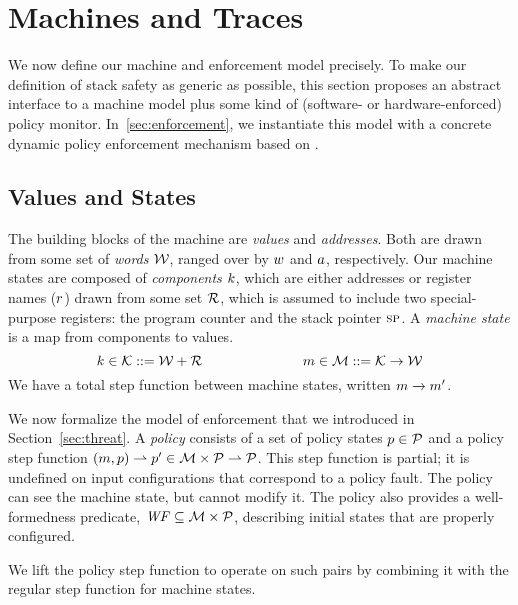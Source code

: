 \documentclass[acmsmall,review,anonymous]{acmart}\settopmatter{printfolios=true,printccs=false,printacmref=false}
\begin{document}
\section{Machines and Traces}
\label{sec:prelim}

We now define our machine and enforcement model precisely. To make our definition of stack safety
as generic as possible, this section proposes an abstract interface to a
machine model plus some kind of (software- or hardware-enforced) policy monitor.
In~\cref{sec:enforcement}, we instantiate this model with a concrete dynamic
policy enforcement mechanism based on \citet{DBLP:conf/sp/RoesslerD18}.

\subsection{Values and States}

The building blocks of the machine are {\em values} and {\em addresses}.
Both are drawn from some set of {\em words} \({\mathcal W}\), ranged over by \(w\) and
\(a\), respectively.
%
Our machine states are composed of {\em components} \(k\),
which are either addresses or register names (\(r\)) drawn from some set
\({\mathcal R}\), which is assumed to include two special-purpose registers: the
program counter {\PCname} and the stack pointer \(\textsc{sp}\).
A {\em machine state} is a map from components to values.
%
    \[k \in {\mathcal K} ::= {\mathcal W} + {\mathcal R}  \hspace{1in}
    m \in {\mathcal M} ::= {\mathcal K} \rightarrow {\mathcal W}\]
%
We have a total step function between machine states, written \(m \xrightarrow{} m'\).

We now formalize the model of enforcement that we introduced in Section~\ref{sec:threat}.
A {\em policy} consists of a set of policy
states \(p \in \mathcal{P}\) and a policy step function \((m, p) \rightharpoonup p' \in
{\mathcal M} \times \mathcal{P} \rightharpoonup \mathcal{P}\). This step function is partial;
it is undefined on input configurations that correspond to a policy fault. The policy
can see the machine state, but cannot modify it. The policy also provides a
well-formedness predicate, \(\mathit{WF} \subseteq {\mathcal M} \times \mathcal{P}\), describing
initial states that are properly configured.
%

We lift the policy step function to operate on such pairs
by combining it with the regular step function for machine states.
\end{document}

